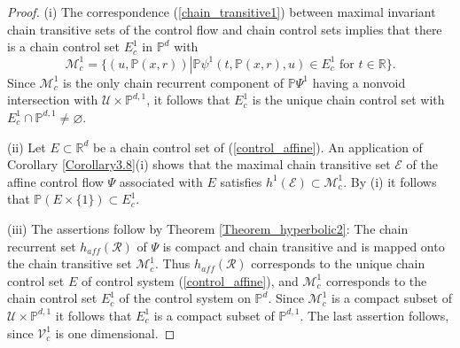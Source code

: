 	\begin{proof}
		(i) The correspondence (\ref{chain_transitive1}) between maximal invariant
		chain transitive sets of the control flow and chain control sets implies that
		there is a chain control set $E_{c}^{1}$ in $\mathbb{P}^{d}$ with
		\[
		\mathcal{M}_{c}^{1}=\{\left(  u,\mathbb{P}\left(  x,r\right)  \right)
		\left\vert \mathbb{P}\psi^{1}(t,\mathbb{P}\left(  x,r\right)  ,u)\in E_{c}%
		^{1}\mbox{ for }t\in\mathbb{R}\right.  \}.
		\]
		Since $\mathcal{M}_{c}^{1}$ is the only chain recurrent component of
		$\mathbb{P}\Psi^{1}$ having a nonvoid intersection with $\mathcal{U}%
		\times\mathbb{P}^{d,1}$, it follows that $E_{c}^{1}$ is the unique chain
		control set with $E_{c}^{1}\cap\mathbb{P}^{d,1}\not =\varnothing$.
		
		(ii) Let $E\subset\mathbb{R}^{d}$ be a chain control set of
		(\ref{control_affine}). An application of Corollary \ref{Corollary3.8}(i)
		shows that the maximal chain transitive set $\mathcal{E}$ of the affine
		control flow $\Psi$ associated with $E$ satisfies $h^{1}(\mathcal{E}%
		)\subset\mathcal{M}_{c}^{1}$. By (i) it follows that $\mathbb{P}\left(
		E\times\{1\}\right)  \subset E_{c}^{1}$.
		
		(iii) The assertions follow by Theorem \ref{Theorem_hyperbolic2}: The chain
		recurrent set $h_{aff}(\mathcal{R})$ of $\Psi$ is compact and chain transitive
		and is mapped onto the chain transitive set $\mathcal{M}_{c}^{1}$. Thus
		$h_{aff}(\mathcal{R})$ corresponds to the unique chain control set $E$ of
		control system (\ref{control_affine}), and $\mathcal{M}_{c}^{1}$ corresponds
		to the chain control set $E_{c}^{1}$ of the control system on $\mathbb{P}^{d}%
		$. Since $\mathcal{M}_{c}^{1}$ is a compact subset of $\mathcal{U}%
		\times\mathbb{P}^{d,1}$ it follows that $E_{c}^{1}$ is a compact subset of
		$\mathbb{P}^{d,1}$. The last assertion follows, since $\mathcal{V}_{c}^{1}$ is
		one dimensional.
	\end{proof}
	
